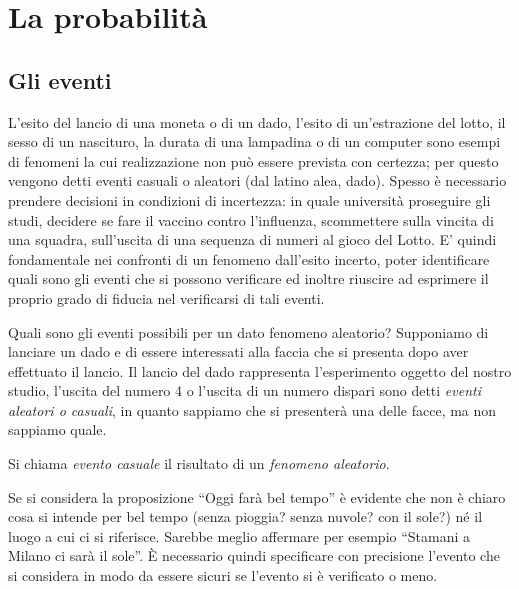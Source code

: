 
\chapter{La probabilità}

\section{Gli eventi}
\label{sec:09_eventi}

L'esito del lancio di una moneta o di un dado, l'esito di un'estrazione del 
lotto, il sesso di un nascituro, la durata di una lampadina o di un computer 
sono esempi di fenomeni la cui realizzazione non può essere prevista con 
certezza; per questo vengono detti eventi casuali o aleatori (dal latino alea, 
dado). Spesso è necessario prendere decisioni in condizioni di incertezza: in 
quale università proseguire gli studi, decidere se fare il vaccino contro 
l'influenza, scommettere sulla vincita di una squadra, sull'uscita di una 
sequenza di numeri al gioco del Lotto. E' quindi fondamentale nei confronti di 
un fenomeno dall'esito incerto, poter identificare quali sono gli eventi che si 
possono verificare ed inoltre riuscire ad esprimere il proprio grado di fiducia 
nel verificarsi di tali eventi.

Quali sono gli eventi possibili per un dato fenomeno aleatorio? Supponiamo di 
lanciare un dado e di essere interessati alla faccia che si presenta dopo aver 
effettuato il lancio. Il lancio del dado rappresenta l'esperimento oggetto del 
nostro studio, l'uscita del numero 4 o l'uscita di un numero dispari sono detti 
\emph{eventi aleatori o casuali}, in quanto sappiamo che si presenterà una 
delle 
facce, ma non sappiamo quale.

\begin{definizione}
Si chiama \emph{evento casuale} il risultato di un \emph{fenomeno aleatorio}.
\end{definizione}

Se si considera la proposizione ``Oggi farà bel tempo'' è evidente che non è 
chiaro cosa si intende per bel tempo (senza pioggia? senza nuvole? con il 
sole?) 
né il luogo a cui ci si riferisce. Sarebbe meglio affermare per esempio 
``Stamani a Milano ci sarà il sole''. È necessario quindi specificare con 
precisione l'evento che si considera in modo da essere sicuri se l'evento si è 
verificato o meno.

